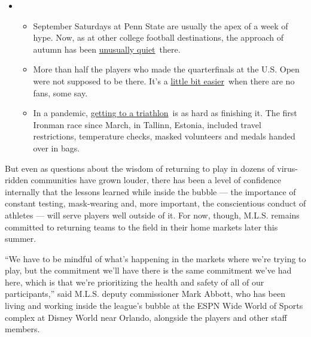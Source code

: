 \begin{itemize}
\item
  \begin{itemize}
  \tightlist
  \item
    September Saturdays at Penn State are usually the apex of a week of
    hype. Now, as at other college football destinations, the approach
    of autumn has been
    \href{https://www.nytimes3xbfgragh.onion/2020/09/09/sports/penn-state-college-football-canceled.html?action=click\&pgtype=Article\&state=default\&region=MAIN_CONTENT_2\&context=storylines_keepup}{unusually
    quiet}~there.
  \item
    More than half the players who made the quarterfinals at the U.S.
    Open were not supposed to be there. It's a
    \href{https://www.nytimes3xbfgragh.onion/2020/09/09/sports/us-open-crowd.html?action=click\&pgtype=Article\&state=default\&region=MAIN_CONTENT_2\&context=storylines_keepup}{little
    bit easier}~when there are no fans, some say.
  \item
    In a pandemic,
    \href{https://www.nytimes3xbfgragh.onion/2020/09/08/sports/ironman-tallinn-triathlon-pandemic.html?action=click\&pgtype=Article\&state=default\&region=MAIN_CONTENT_2\&context=storylines_keepup}{getting
    to a triathlon}~is as hard as finishing it. The first Ironman race
    since March, in Tallinn, Estonia, included travel restrictions,
    temperature checks, masked volunteers and medals handed over in
    bags.
  \end{itemize}
\end{itemize}

But even as questions about the wisdom of returning to play in dozens of
virus-ridden communities have grown louder, there has been a level of
confidence internally that the lessons learned while inside the bubble
--- the importance of constant testing, mask-wearing and, more
important, the conscientious conduct of athletes --- will serve players
well outside of it. For now, though, M.L.S. remains committed to
returning teams to the field in their home markets later this summer.

``We have to be mindful of what's happening in the markets where we're
trying to play, but the commitment we'll have there is the same
commitment we've had here, which is that we're prioritizing the health
and safety of all of our participants,'' said M.L.S. deputy commissioner
Mark Abbott, who has been living and working inside the league's bubble
at the ESPN Wide World of Sports complex at Disney World near Orlando,
alongside the players and other staff members.


